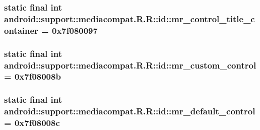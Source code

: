 \hypertarget{classandroid_1_1support_1_1mediacompat_1_1_r_1_1id_e1c852eba0e64f5f7ece4e0e002e6c6a}{
\subsubsection[{mr\_\-control\_\-title\_\-container}]{\setlength{\rightskip}{0pt plus 5cm}static final int android::support::mediacompat.R.R::id::mr\_\-control\_\-title\_\-container = 0x7f080097}}
\label{classandroid_1_1support_1_1mediacompat_1_1_r_1_1id_e1c852eba0e64f5f7ece4e0e002e6c6a}


\hypertarget{classandroid_1_1support_1_1mediacompat_1_1_r_1_1id_4ba05ac038f4f32b9b141a1a73807406}{
\subsubsection[{mr\_\-custom\_\-control}]{\setlength{\rightskip}{0pt plus 5cm}static final int android::support::mediacompat.R.R::id::mr\_\-custom\_\-control = 0x7f08008b}}
\label{classandroid_1_1support_1_1mediacompat_1_1_r_1_1id_4ba05ac038f4f32b9b141a1a73807406}


\hypertarget{classandroid_1_1support_1_1mediacompat_1_1_r_1_1id_9ee7c42e9f6acb17f3919396d47972fe}{
\subsubsection[{mr\_\-default\_\-control}]{\setlength{\rightskip}{0pt plus 5cm}static final int android::support::mediacompat.R.R::id::mr\_\-default\_\-control = 0x7f08008c}}
\label{classandroid_1_1support_1_1mediacompat_1_1_r_1_1id_9ee7c42e9f6acb17f3919396d47972fe}


